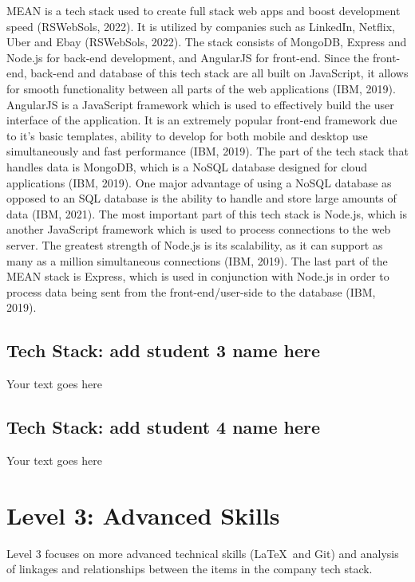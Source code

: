 \documentclass[a4paper, 11pt]{report}
\begin{document}
MEAN is a tech stack used to create full stack web apps and boost development speed (RSWebSols, 2022). It is utilized by companies such as LinkedIn, Netflix, Uber and Ebay (RSWebSols, 2022). The stack consists of MongoDB, Express and Node.js for back-end development, and AngularJS for front-end. Since the front-end, back-end and database of this tech stack are all built on JavaScript, it allows for smooth functionality between all parts of the web applications (IBM, 2019). AngularJS is a JavaScript framework which is used to effectively build the user interface of the application. It is an extremely popular front-end framework due to it's basic templates, ability to develop for both mobile and desktop use simultaneously and fast performance (IBM, 2019). The part of the tech stack that handles data is MongoDB, which is a NoSQL database designed for cloud applications (IBM, 2019). One major advantage of using a NoSQL database as opposed to an SQL database is the ability to handle and store large amounts of data (IBM, 2021). The most important part of this tech stack is Node.js, which is another JavaScript framework which is used to process connections to the web server. The greatest strength of Node.js is its scalability, as it can support as many as a million simultaneous connections (IBM, 2019). The last part of the MEAN stack is Express, which is used in conjunction with Node.js in order to process data being sent from the front-end/user-side to the database (IBM, 2019).

\subsection{Tech Stack: add student 3 name here}

Your text goes here

\subsection{Tech Stack: add student 4 name here}

Your text goes here



\newpage
\section{Level 3: Advanced Skills}

Level 3 focuses on more advanced technical skills (\LaTeX\ and Git) and analysis of linkages and relationships between the items in the company tech stack.
\end{document}
